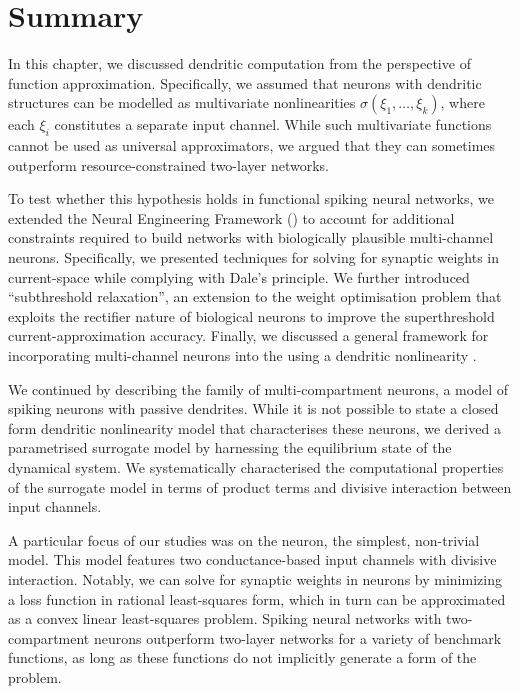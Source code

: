 
\section{Summary}
\label{sec:nlif_discussion}

In this chapter, we discussed dendritic computation from the perspective of function approximation.
Specifically, we assumed that neurons with dendritic structures can be modelled as multivariate nonlinearities $\sigma(\xi_1, \ldots, \xi_k)$, where each $\xi_i$ constitutes a separate input channel.
While such multivariate functions cannot be used as universal approximators, we argued that they can sometimes outperform resource-constrained two-layer networks.

To test whether this hypothesis holds in functional spiking neural networks, we extended the Neural Engineering Framework (\NEF) to account for additional constraints required to build networks with biologically plausible multi-channel neurons.
Specifically, we presented techniques for solving for synaptic weights in current-space while complying with Dale's principle.
We further introduced \enquote{subthreshold relaxation}, an extension to the weight optimisation problem that exploits the rectifier nature of biological neurons to improve the superthreshold current-approximation accuracy.
Finally, we discussed a general framework for incorporating multi-channel neurons into the \NEF using a dendritic nonlinearity \Hden.

We continued by describing the \nlif family of multi-compartment neurons, a model of spiking neurons with passive dendrites.
While it is not possible to state a closed form dendritic nonlinearity model \Hden that characterises these neurons, we derived a parametrised surrogate model by harnessing the equilibrium state of the \nlif dynamical system.
We systematically characterised the computational properties of the surrogate model in terms of product terms and divisive interaction between input channels.

A particular focus of our studies was on the \twocomplif neuron, the simplest, non-trivial \nlif model.
This model features two conductance-based input channels with divisive interaction.
Notably, we can solve for synaptic weights in \twocomplif neurons by minimizing a loss function in rational least-squares form, which in turn can be approximated as a convex linear least-squares problem.
Spiking neural networks with two-compartment neurons outperform two-layer networks for a variety of benchmark functions, as long as these functions do not implicitly generate a form of the \XOR problem.

